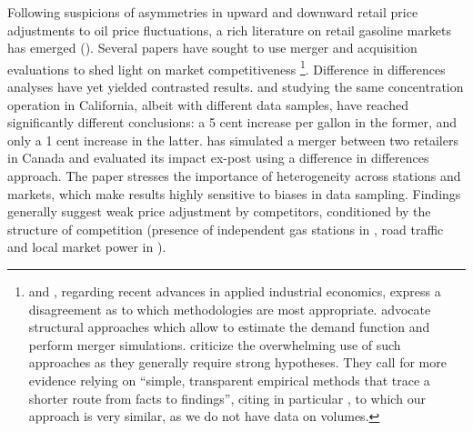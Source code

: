 \documentclass[english]{article}
\begin{document}
Following suspicions of asymmetries in upward and downward retail price adjustments to oil price fluctuations, a rich literature on retail gasoline markets has emerged (\cite{ECK13}). Several papers have sought to use merger and acquisition evaluations to shed light on market competitiveness%
\footnote{\cite{EIN10} and \cite{ANG10}, regarding recent advances in applied industrial economics, express a disagreement as to which methodologies are most appropriate. \cite{EIN10} advocate structural approaches which allow to estimate the demand function and perform merger simulations. \cite{ANG10} criticize the overwhelming use of such approaches as they generally require strong hypotheses. They call for more evidence relying on ``simple, transparent empirical methods that trace a shorter route from facts to findings'', citing in particular \cite{HAS04}, to which our approach is very similar, as we do not have data on volumes.%
}. Difference in differences analyses have yet yielded contrasted results. \cite{HAS04} and \cite{TAY10} studying the same concentration operation in California, albeit with different data samples, have reached significantly different conclusions: a 5 cent increase per gallon in the former, and only a 1 cent increase in the latter. \cite{HOU12} has simulated a merger between two retailers in Canada and evaluated its impact ex-post using a difference in differences approach. The paper stresses the importance of heterogeneity across stations and markets, which make results highly sensitive to biases in data sampling. Findings generally suggest weak price adjustment by competitors, conditioned by the structure of competition (presence of independent gas stations in \cite{HAS04}, road traffic and local market power in \cite{HOU12}).
\end{document}
